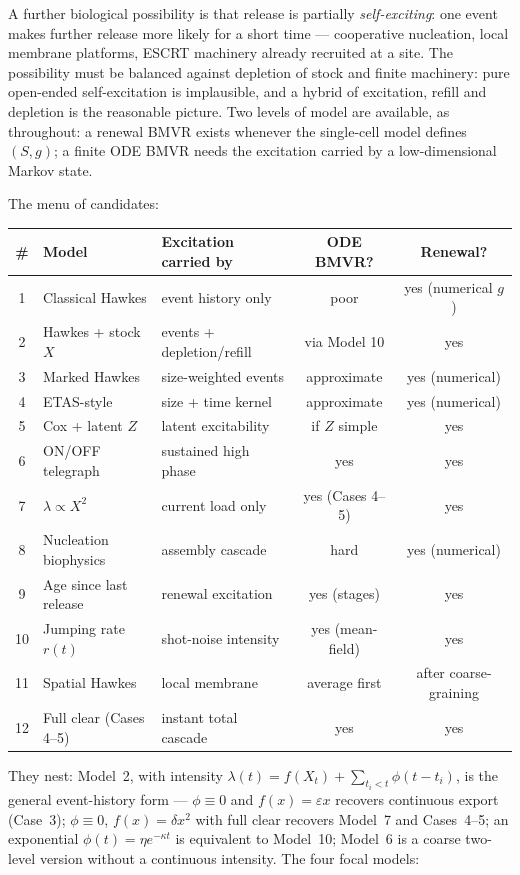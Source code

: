 A further biological possibility is that release is partially
\emph{self-exciting}: one event makes further release more likely for a
short time --- cooperative nucleation, local membrane platforms, ESCRT
machinery already recruited at a site. The possibility must be balanced
against depletion of stock and finite machinery: pure open-ended
self-excitation is implausible, and a hybrid of excitation, refill and
depletion is the reasonable picture. Two levels of model are available, as
throughout: a renewal BMVR exists whenever the single-cell model defines
$(S,g)$; a finite ODE BMVR needs the excitation carried by a
low-dimensional Markov state.

The menu of candidates:
\begin{center}
\renewcommand{\arraystretch}{1.15}
\small
\begin{tabular}{@{}clp{}cc@{}}
\toprule
\# & Model & Excitation carried by & ODE BMVR? & Renewal? \\
\midrule
1 & Classical Hawkes & event history only & poor & yes (numerical $g$) \\
2 & Hawkes + stock $X$ & events + depletion/refill & via Model 10 & yes \\
3 & Marked Hawkes & size-weighted events & approximate & yes (numerical) \\
4 & ETAS-style & size + time kernel & approximate & yes (numerical) \\
5 & Cox + latent $Z$ & latent excitability & if $Z$ simple & yes \\
6 & ON/OFF telegraph & sustained high phase & yes & yes \\
7 & $\lambda\propto X^2$ & current load only & yes (Cases 4--5) & yes \\
8 & Nucleation biophysics & assembly cascade & hard & yes (numerical) \\
9 & Age since last release & renewal excitation & yes (stages) & yes \\
10 & Jumping rate $r(t)$ & shot-noise intensity & yes (mean-field) & yes \\
11 & Spatial Hawkes & local membrane & average first & after coarse-graining \\
12 & Full clear (Cases 4--5) & instant total cascade & yes & yes \\
\bottomrule
\end{tabular}
\end{center}
They nest: Model~2, with intensity $\lambda(t)=f(X_t)+\sum_{t_i<t}\phi(t-t_i)$,
is the general event-history form --- $\phi\equiv0$ and $f(x)=\varepsilon x$
recovers continuous export (Case~3); $\phi\equiv0$, $f(x)=\delta x^2$ with
full clear recovers Model~7 and Cases~4--5; an exponential
$\phi(t)=\eta e^{-\kappa t}$ is equivalent to Model~10; Model~6 is a coarse
two-level version without a continuous intensity. The four focal models:

